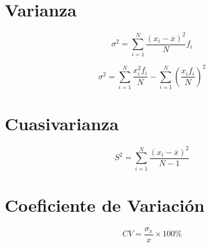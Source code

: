 \section{Varianza}

      \begin{minipage}[b]{\textwidth}
\begin{minipage}[b]{0.5 \textwidth}
 \begin{equation*}
        { \sigma  }^{ 2 }=\sum _{ i=1 }^{ N }{ \frac { { \left( { x }_{ i }-\overline { x }  \right)  }^{ 2 } }{ N }  } { f }_{ i }
    \end{equation*}
\end{minipage} \hfill \begin{minipage}[b]{0.5 \textwidth}
\begin{equation*}
        { \sigma  }^{ 2 }=\sum _{ i=1 }^{ N }{ \frac { { x }_{ i }^{ 2 }{ f }_{ i } }{ N }  } -\sum _{ i=1 }^{ N }{ { \left( \frac { { x }_{ i }{ f }_{ i } }{ N }  \right)  }^{ 2 } } 
    \end{equation*}
\end{minipage}
\end{minipage}

    \begin{minipage}[b]{\textwidth}
    \begin{minipage}[b]{0.5 \textwidth}

\section{Cuasivarianza}
    \begin{equation*}
        { S }^{ 2 }=\sum _{ i=1 }^{ N }{ \frac { { \left( { x }_{ i }-\overline { x }  \right)  }^{ 2 } }{ N-1 }  } 
    \end{equation*}
    \end{minipage} \hfill 
    \begin{minipage}[b]{0.5 \textwidth}


\section{Coeficiente de Variación}
    \begin{equation*}
        CV=\frac { { \sigma  }_{ x } }{ x } \times 100\%
    \end{equation*}

    \end{minipage}
    \end{minipage}
    
